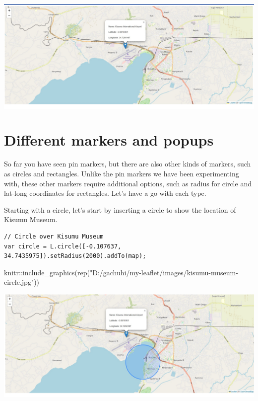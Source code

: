 \documentclass[
]{book}
\newenvironment{Shaded}{\begin{snugshade}}{\end{snugshade}}
\newcommand{\FunctionTok}[1]{\textcolor[rgb]{0.00,0.00,0.00}{#1}}
\newcommand{\NormalTok}[1]{#1}
\newcommand{\SpecialCharTok}[1]{\textcolor[rgb]{0.00,0.00,0.00}{#1}}
\newcommand{\StringTok}[1]{\textcolor[rgb]{0.31,0.60,0.02}{#1}}
\begin{document}
\includegraphics[width=26.6in]{../images/marker-html}

\hypertarget{different-markers-and-popups}{%
\section{Different markers and popups}\label{different-markers-and-popups}}

So far you have seen pin markers, but there are also other kinds of markers, such as circles and rectangles. Unlike the pin markers we have been experimenting with, these other markers require additional options, such as radius for circle and lat-long coordinates for rectangles. Let's have a go with each type.

Starting with a circle, let's start by inserting a circle to show the location of Kisumu Museum.

\begin{verbatim}
// Circle over Kisumu Museum
var circle = L.circle([-0.107637, 34.7435975]).setRadius(2000).addTo(map);
\end{verbatim}

\begin{Shaded}
\begin{Highlighting}[]
\NormalTok{knitr}\SpecialCharTok{::}\FunctionTok{include\_graphics}\NormalTok{(}\FunctionTok{rep}\NormalTok{(}\StringTok{"D:/gachuhi/my{-}leaflet/images/kisumu{-}museum{-}circle.jpg"}\NormalTok{))}
\end{Highlighting}
\end{Shaded}

\includegraphics[width=26.5in]{../images/kisumu-museum-circle}
\end{document}
